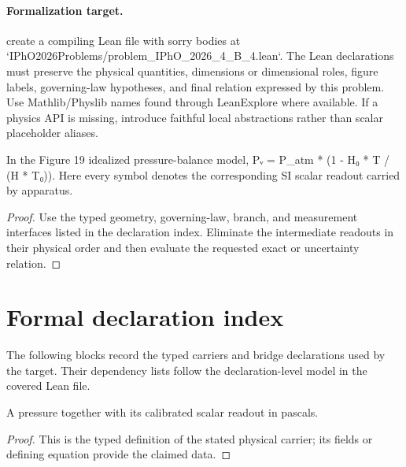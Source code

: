 \paragraph{Formalization target.}
create a compiling Lean file with sorry bodies at `IPhO2026Problems/problem\_IPhO\_2026\_4\_B\_4.lean`. The Lean declarations must preserve the physical quantities, dimensions or dimensional roles, figure labels, governing-law hypotheses, and final relation expressed by this problem.
Use Mathlib/Physlib names found through LeanExplore where available. If a physics API is missing, introduce faithful local abstractions rather than scalar placeholder aliases.

\begin{theorem}
  \label{thm:physics:IPhO_2026_4_B_4:target}
  In the Figure 19 idealized pressure-balance model, Pᵥ = P\_atm * (1 - H₀ * T / (H * T₀)). Here every symbol denotes the corresponding SI scalar readout carried by apparatus.
\end{theorem}
\begin{proof}
  Use the typed geometry, governing-law, branch, and measurement interfaces listed in the declaration index.  Eliminate the intermediate readouts in their physical order and then evaluate the requested exact or uncertainty relation.
\end{proof}
\section*{Formal declaration index}
The following blocks record the typed carriers and bridge declarations used by the target.  Their dependency lists follow the declaration-level model in the covered Lean file.

\begin{definition}
  \label{def:physics:IPhO_2026_4_B_4:aux001}
  A pressure together with its calibrated scalar readout in pascals.
\end{definition}
\begin{proof}
  This is the typed definition of the stated physical carrier; its fields or defining equation provide the claimed data.
\end{proof}

